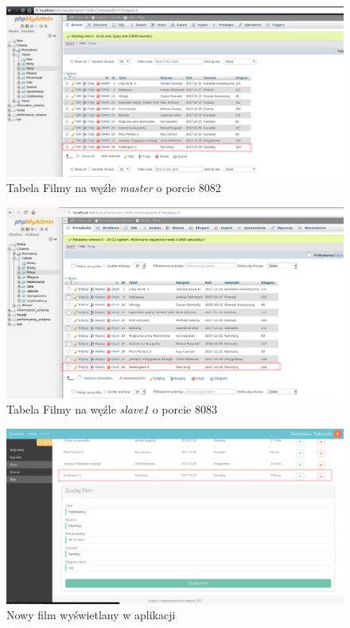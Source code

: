 \begin{figure} [H]
	\centering
	\includegraphics[width=1\linewidth]{rozdzial06/7.png}
	\caption{Tabela Filmy na węźle \textit{master} o porcie 8082}
	\label{fig:FilmMaster}
\end{figure}

\begin{figure} [H]
	\centering
	\includegraphics[width=1\linewidth]{rozdzial06/8.png}
	\caption{Tabela Filmy na węźle \textit{slave1} o porcie 8083}
	\label{fig:FilmSlave}
\end{figure}

\begin{figure} [H]
	\centering
	\includegraphics[width=1\linewidth]{rozdzial06/6.png}
	\caption{Nowy film wyświetlany w aplikacji}
	\label{fig:endAddFilm}
\end{figure}


